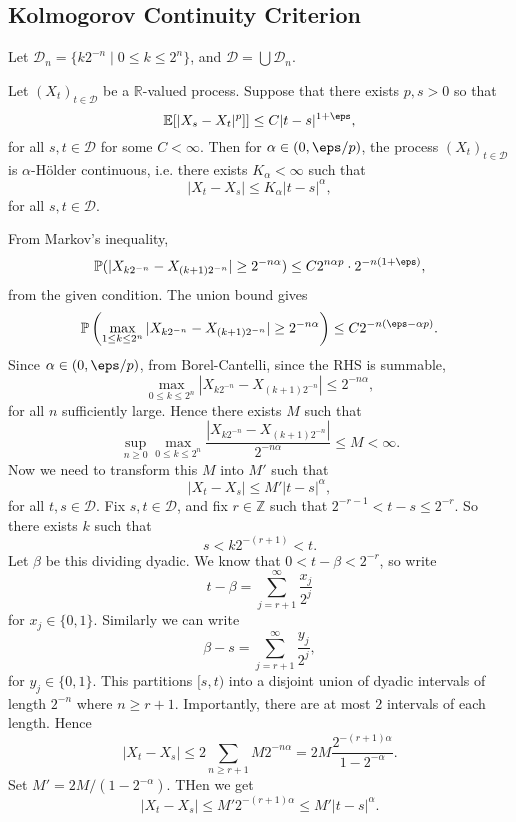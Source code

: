\documentclass[12pt]{article}
\begin{document}
\subsection{Kolmogorov Continuity Criterion}%
\label{sub:kcc}

Let $\mathcal{D}_n = \{k 2^{-n} \mid 0 \leq k \leq 2^{n}\}$, and $\mathcal{D} = \bigcup \mathcal{D}_n$.

\begin{theorem}
	Let $(X_t)_{t \in \mathcal{D}}$ be a $\mathbb{R}$-valued process. Suppose that there exists $p, s > 0$ so that
	\[
		\mathbb{E}[|X_s - X_t|^{p}]] \leq C |t - s|^{1 + \eps},
	\]
	for all $s, t \in \mathcal{D}$ for some $C < \infty$. Then for $\alpha \in (0, \eps/p)$, the process $(X_t)_{t \in \mathcal{D}}$ is $\alpha$-H\"older continuous, i.e. there exists $K_\alpha <  \infty$ such that
	\[
	|X_t - X_s| \leq K_\alpha |t - s|^{\alpha},
	\]
	for all $s, t \in \mathcal{D}$.
\end{theorem}

\begin{proofbox}
	From Markov's inequality,
	\[
		\mathbb{P}(|X_{k2^{-n}} - X_{(k+1)2^{-n}}| \geq 2^{-n \alpha} ) \leq C 2^{n \alpha p}\cdot 2^{-n(1 + \eps)},
	\]
	from the given condition. The union bound gives
	\[
		\mathbb{P}\left( \max_{1 \leq k \leq 2^{n}} |X_{k2^{-n}} - X_{(k+1)2^{-n}}| \geq 2^{-n \alpha}\right) \leq C 2^{-n(\eps - \alpha p)}.
	\]
	Since $\alpha \in (0, \eps/p)$, from Borel-Cantelli, since the RHS is summable,
	\[
	\max_{0 \leq k \leq 2^{n}} |X_{k2^{-n}} - X_{(k+1)2^{-n}}| \leq 2^{-n \alpha},
	\]
	for all $n$ sufficiently large. Hence there exists $M$ such that
	\[
	\sup_{n \geq 0} \max_{0 \leq k \leq 2^{n}} \frac{|X_{k2^{-n}} - X_{(k+1)2^{-n}}|}{2^{-n\alpha}} \leq M < \infty.
	\]
	Now we need to transform this $M$ into $M'$ such that
	\[
	|X_t - X_s| \leq M' |t - s|^{\alpha},
	\]
	for all $t, s \in \mathcal{D}$. Fix $s, t \in \mathcal{D}$, and fix $r \in \mathbb{Z}$ such that $2^{-r-1} < t - s \leq 2^{-r}$. So there exists $k$ such that
	\[
	s < k2^{-(r+1)} < t.
	\]
	Let $\beta$ be this dividing dyadic. We know that $0 < t - \beta < 2^{-r}$, so write
	\[
	t - \beta = \sum_{j = r+1}^\infty \frac{x_j}{2^{j}}
	\]
	for $x_j \in \{0, 1\}$. Similarly we can write
	\[
	\beta - s = \sum_{j = r + 1}^{\infty} \frac{y_j}{2^{j}},
	\]
	for $y_j \in \{0, 1\}$. This partitions $[s, t)$ into a disjoint union of dyadic intervals of length $2^{-n}$ where $n \geq r+1$. Importantly, there are at most $2$ intervals of each length. Hence
	\[
	|X_t - X_s| \leq 2 \sum_{n \geq r + 1} M 2^{-n \alpha} = 2 M \frac{2^{-(r+1)\alpha}}{1 - 2^{-\alpha}}.
	\]
	Set $M' = 2M / (1 - 2^{-\alpha})$. THen we get
	\[
	|X_t - X_s| \leq M' 2^{-(r+1)\alpha} \leq M' |t - s|^{\alpha}.
	\]
\end{proofbox}
\end{document}
